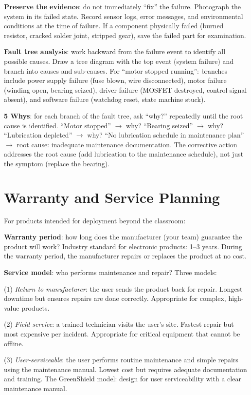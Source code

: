 \textbf{Preserve the evidence}: do not immediately ``fix'' the failure. Photograph the system in its failed state. Record sensor logs, error messages, and environmental conditions at the time of failure. If a component physically failed (burned resistor, cracked solder joint, stripped gear), save the failed part for examination.

\textbf{Fault tree analysis}: work backward from the failure event to identify all possible causes. Draw a tree diagram with the top event (system failure) and branch into causes and sub-causes. For ``motor stopped running'': branches include power supply failure (fuse blown, wire disconnected), motor failure (winding open, bearing seized), driver failure (MOSFET destroyed, control signal absent), and software failure (watchdog reset, state machine stuck).

\textbf{5 Whys}: for each branch of the fault tree, ask ``why?'' repeatedly until the root cause is identified. ``Motor stopped'' $\to$ why? ``Bearing seized'' $\to$ why? ``Lubrication depleted'' $\to$ why? ``No lubrication schedule in maintenance plan'' $\to$ root cause: inadequate maintenance documentation. The corrective action addresses the root cause (add lubrication to the maintenance schedule), not just the symptom (replace the bearing).

\section{Warranty and Service Planning}
For products intended for deployment beyond the classroom:

\textbf{Warranty period}: how long does the manufacturer (your team) guarantee the product will work? Industry standard for electronic products: 1--3 years. During the warranty period, the manufacturer repairs or replaces the product at no cost.

\textbf{Service model}: who performs maintenance and repair? Three models:

(1) \emph{Return to manufacturer}: the user sends the product back for repair. Longest downtime but ensures repairs are done correctly. Appropriate for complex, high-value products.

(2) \emph{Field service}: a trained technician visits the user's site. Fastest repair but most expensive per incident. Appropriate for critical equipment that cannot be offline.

(3) \emph{User-serviceable}: the user performs routine maintenance and simple repairs using the maintenance manual. Lowest cost but requires adequate documentation and training. The GreenShield model: design for user serviceability with a clear maintenance manual.

